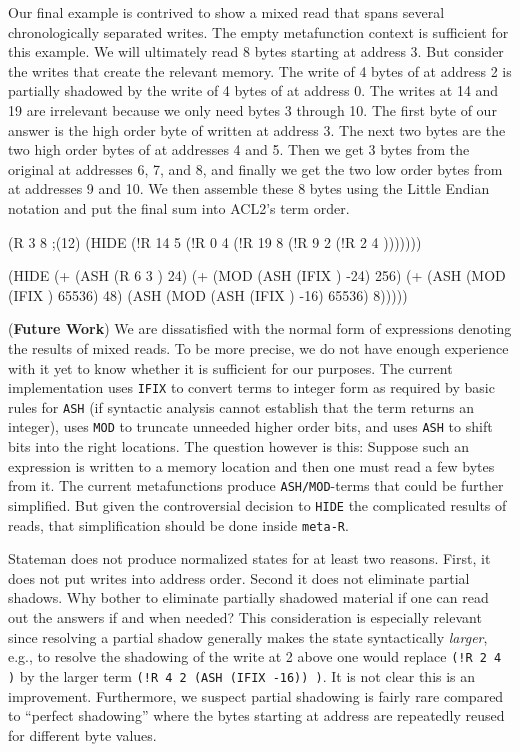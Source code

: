 \documentclass[submission,copyright,creativecommons]{eptcs}
\newcommand{\ptt}[1]{\tt{#1}}
\begin{document}
Our final example is contrived to show a mixed read that spans several
chronologically separated writes.  The empty metafunction context is
sufficient for this example.  We will ultimately read 8 bytes starting at
address 3.  But consider the writes that create the relevant memory.  The
write of 4 bytes of  at address 2 is partially shadowed by the write of 4
bytes of  at address 0.  The writes at 14 and 19 are irrelevant because we
only need bytes 3 through 10.  The first byte of our answer is the high
order byte of  written at address 3.  The next two bytes are the two high
order bytes of  at addresses 4 and 5.  Then we get 3 bytes from the original
 at addresses 6, 7, and 8, and finally we get the two low order bytes
from  at addresses 9 and 10.  We then assemble these 8 bytes using the
Little Endian notation and put the final sum into ACL2's term order.

\begin{acl2p}
(R 3 8                                                                ;{\rm{(12)}}
   (HIDE 
    (!R 14 5 
        (!R 0 4  
            (!R 19 8 
                (!R 9 2 
                    (!R 2 4  )))))))

(HIDE (+ (ASH (R 6 3 ) 24)
         (+ (MOD (ASH (IFIX ) -24) 256)
            (+ (ASH (MOD (IFIX ) 65536) 48)
               (ASH (MOD (ASH (IFIX ) -16) 65536) 8)))))
\end{acl2p}
({\bf{Future Work}}) We are dissatisfied with the normal form of expressions
denoting the results of mixed reads.  To be more precise, we do not have
enough experience with it yet to know whether it is sufficient for our
purposes.  The current implementation uses {\ptt{IFIX}} to convert terms to
integer form as required by basic rules for {\ptt{ASH}} (if syntactic
analysis cannot establish that the term returns an integer), uses {\ptt{MOD}}
to truncate unneeded higher order bits, and uses {\ptt{ASH}} to shift bits
into the right locations.  The question however is this: Suppose such an
expression is written to a memory location and then one must read a few bytes
from it.  The current metafunctions produce {\ptt{ASH/MOD}}-terms that could
be further simplified.  But given the controversial decision to {\ptt{HIDE}} the
complicated results of reads, that simplification should be done inside
{\ptt{meta-R}}.

Stateman does not produce normalized states for at least two reasons.
First, it does not put writes into address order.  Second it does not
eliminate partial shadows.  Why bother to eliminate partially shadowed
material if one can read out the answers if and when needed?  This
consideration is especially relevant since resolving a partial shadow
generally makes the state syntactically {\em{larger}}, e.g., to resolve the
shadowing of the write at 2 above one would replace {\ptt{(!R 2 4  )}}
by the larger term {\ptt{(!R 4 2 (ASH (IFIX  -16)) )}}.  It is not
clear this is an improvement.  Furthermore, we suspect partial shadowing is
fairly rare compared to ``perfect shadowing'' where the  bytes starting at
address  are repeatedly reused for different  byte values.
\end{document}
